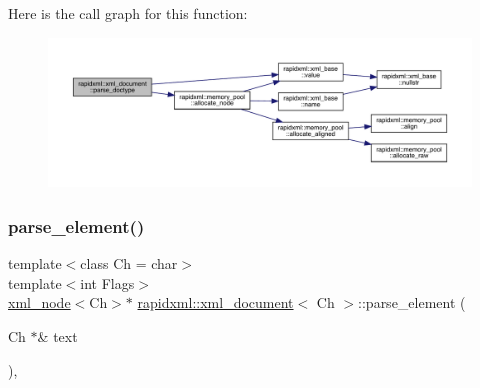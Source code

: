 Here is the call graph for this function\+:\nopagebreak
\begin{figure}[H]
\begin{center}
\leavevmode
\includegraphics[width=350pt]{classrapidxml_1_1xml__document_a4c613f3a928f763b4c788422edda5860_cgraph}
\end{center}
\end{figure}
\mbox{\label{classrapidxml_1_1xml__document_aea385acd096ab200d63a777d53435ada}} 
\subsubsection{\texorpdfstring{parse\_element()}{parse\_element()}}
{\footnotesize\ttfamily template$<$class Ch = char$>$ \\
template$<$int Flags$>$ \\
\mbox{\hyperlink{classrapidxml_1_1xml__node}{xml\+\_\+node}}$<$Ch$>$$\ast$ \mbox{\hyperlink{classrapidxml_1_1xml__document}{rapidxml\+::xml\+\_\+document}}$<$ Ch $>$\+::parse\+\_\+element (\begin{DoxyParamCaption}\item[{Ch $\ast$\&}]{text }\end{DoxyParamCaption})\hspace{0.3cm}{\ttfamily [inline]}, {\ttfamily [private]}}

